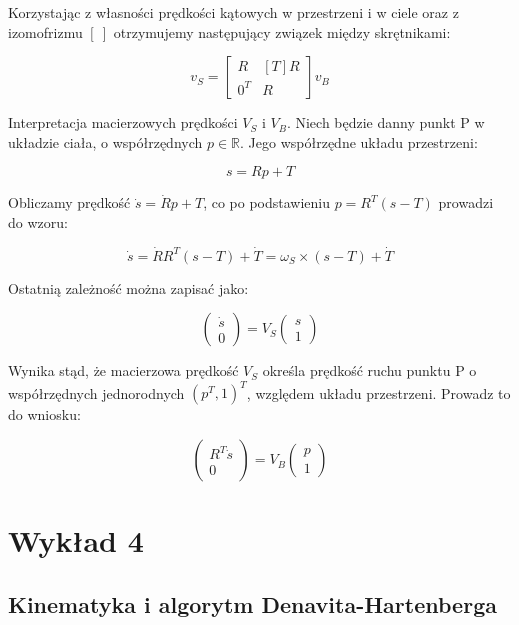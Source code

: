 \documentclass{article}
\begin{document}
Korzystając z własności prędkości kątowych w przestrzeni i w ciele oraz z izomofrizmu $\left[ \ \right]$ otrzymujemy następujący związek między skrętnikami:

$$
    v_{S}=
    \begin{bmatrix}
        R     & \left[T\right]R \\[0.3em]
        0^{T} & R
    \end{bmatrix}
    v_{B}
$$



Interpretacja macierzowych prędkości $V_{S}$ i $V_{B}$. Niech będzie danny punkt P w układzie ciała, o współrzędnych $p \in \mathbb{R}$. Jego współrzędne układu przestrzeni:

$$
    s=Rp+T
$$

Obliczamy prędkość $\dot s=\dot R p + T$, co po podstawieniu $p=R^{T}\left(s-T\right)$ prowadzi do wzoru:

$$
    \dot s = \dot R R^{T} (s-T)+\dot T= \omega_{S}\times (s-T)+\dot T
$$

Ostatnią zależność można zapisać jako:

$$
    \begin{pmatrix}
        \dot s \\[0.3em]
        0
    \end{pmatrix}
    =V_{S}
    \begin{pmatrix}
        s \\[0.3em]
        1
    \end{pmatrix}
$$

Wynika stąd, że macierzowa prędkość $V_{S}$ określa prędkość ruchu punktu P o współrzędnych jednorodnych $(p^{T}, 1)^{T}$, względem układu przestrzeni. Prowadz to do wniosku:

$$
    \begin{pmatrix}
        R^{T}\dot s \\[0.3em]
        0
    \end{pmatrix}
    =V_{B}
    \begin{pmatrix}
        p \\[0.3em]
        1
    \end{pmatrix}
$$


\newpage

\section{Wykład 4}

\subsection{Kinematyka i algorytm Denavita-Hartenberga}
\end{document}
